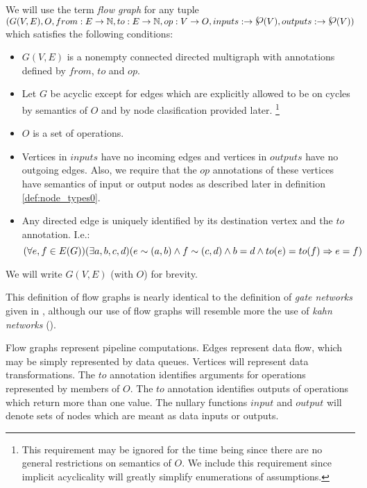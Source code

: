   We will use the term \emph{flow graph} for any tuple $(G(V,E),O,from:E \arrow \N, to:E \arrow \N, op:V \arrow O,\\ inputs: \arrow \powerset(V), outputs: \arrow \powerset(V) )$ which satisfies the following conditions:
\begin{itemize}
  \item $G(V,E)$ is a nonempty connected directed multigraph with annotations defined by $from$, $to$ and $op$.  
  \item Let $G$ be acyclic except for edges which are explicitly allowed to be on cycles by semantics of $O$ and by node clasification provided later. \footnote{This requirement may be ignored for the time being since there are no general restrictions on semantics of $O$. We include this requirement since implicit acyclicality will greatly simplify enumerations of assumptions.}
  \item $O$ is a set of operations.
  \item Vertices in $inputs$ have no incoming edges and vertices in $outputs$ have no outgoing edges. Also, we require that the $op$ annotations of these vertices have semantics of input or output nodes as described later in definition \ref{def:node_types0}.
  \item Any directed edge is uniquely identified by its destination vertex and the $to$ annotation. I.e.:
    $$ (\forall{e,f \in E(G)})(\exists a,b,c,d)\\(e \sim (a,b) \land f \sim (c,d) \land b = d \land to(e) = to(f) \Rightarrow e = f )$$
\end {itemize}
    We will write $G(V,E)$ (with $O$) for brevity.
\myenddef

  This definition of flow graphs is nearly identical to the definition of \emph{gate networks} given in \cite{ads}, although our use of flow graphs will resemble more the use of \emph{kahn networks} (\cite{asdfe}). 

  Flow graphs represent pipeline computations. Edges represent data flow, which may be simply represented by data queues. Vertices will represent data transformations. The $to$ annotation identifies arguments for operations represented by members of $O$. The $to$ annotation identifies outputs of operations which return more than one value. The nullary functions $input$ and $output$ will denote sets of nodes which are meant as data inputs or outputs.

